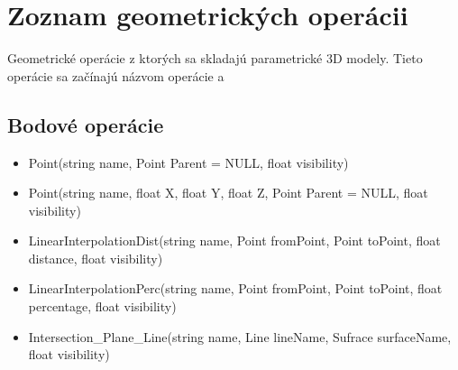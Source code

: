 \chapter{Zoznam geometrických operácii}
\label{Priloha:zoznamGeometrickychOperacii}
Geometrické operácie z ktorých sa skladajú parametrické 3D modely. Tieto operácie sa začínajú názvom operácie a 

\section{Bodové operácie}
\begin{itemize}
		\item Point(string name, Point Parent = NULL, float visibility)

		\item Point(string name, float X, float Y, float Z, Point Parent = NULL, float visibility) 

		\item LinearInterpolationDist(string name, Point fromPoint, Point toPoint, float distance, float visibility)
		
		\item LinearInterpolationPerc(string name, Point fromPoint, Point toPoint, float percentage, float visibility)

		\item Intersection\_Plane\_Line(string name, Line lineName, Sufrace surfaceName, float visibility)



\end{itemize}
